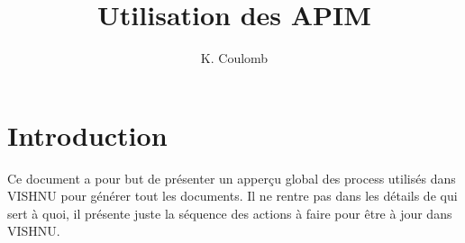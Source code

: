 \documentclass{article}
\title{Utilisation des APIM}
\author{K. Coulomb}
\begin{document}
\frontmatter %
\maketitle %
\tableofcontents %
\mainmatter %


\section*{Introduction}
Ce document a pour but de présenter un apperçu global des process utilisés dans VISHNU pour générer tout les documents.
Il ne rentre pas dans les détails de qui sert à quoi, il présente juste la séquence des actions à faire pour être à jour dans VISHNU.
\end{document}
